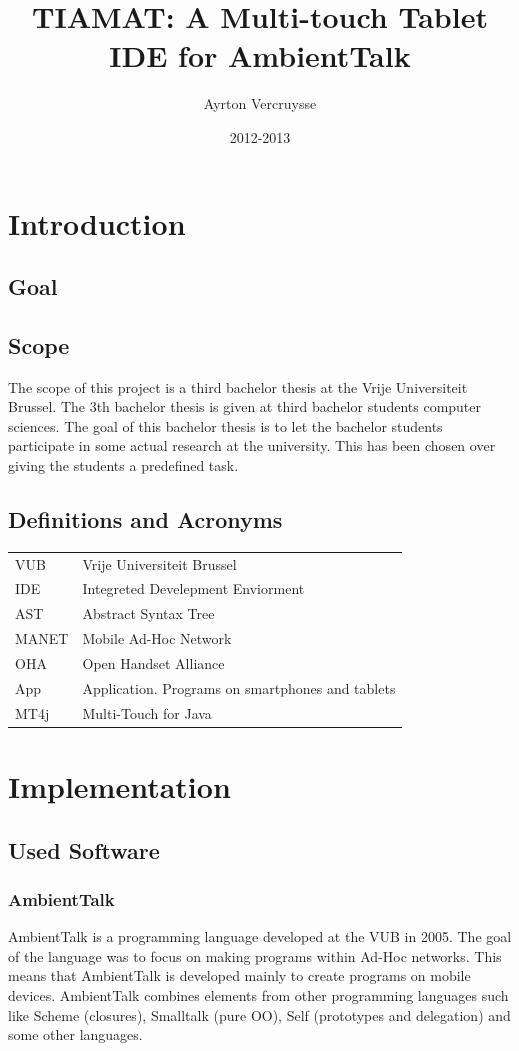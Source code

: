 \documentclass[a4paper,12pt]{report}
\author{Ayrton Vercruysse}
\title{TIAMAT: A Multi-touch Tablet IDE for AmbientTalk}
\date{2012-2013}
\begin{document}
\maketitlepage
\tableofcontents
\chapter{Introduction}
\section{Goal}



\section{Scope}
The scope of this project is a third bachelor thesis at the Vrije Universiteit Brussel. The 3th bachelor thesis is given at third bachelor students computer sciences. The goal of this bachelor thesis
is to let the bachelor students  participate in some actual research at the university. This has been chosen over giving the students a predefined task.
\section{Definitions and Acronyms}

\begin{tabular}{ l l }
  VUB & Vrije Universiteit Brussel \\
  IDE & Integreted Develepment Enviorment \\
  AST & Abstract Syntax Tree \\
  MANET 	& Mobile Ad-Hoc Network \\
  OHA & Open Handset Alliance \\
  App & Application. Programs on smartphones and tablets \\
  MT4j & Multi-Touch for Java \\
\end{tabular}
\chapter{Implementation}
\section{Used Software}
\subsection{AmbientTalk}
AmbientTalk is a programming language developed at the VUB in 2005. The goal of the language was to focus on making programs within Ad-Hoc networks. This means that AmbientTalk is developed mainly
to create programs on mobile devices. AmbientTalk combines elements from other programming languages such like Scheme (closures), Smalltalk (pure OO), Self (prototypes and delegation) and some
other languages.
\end{document}
